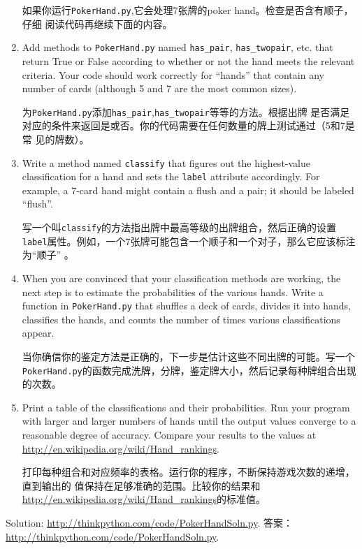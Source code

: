 \documentclass[10pt]{book}
\begin{document}
\begin{CJK}{UTF8}{gbsn}
\begin{exercise}
\begin{enumerate}
如果你运行{\tt PokerHand.py},它会处理7张牌的poker hand。检查是否含有顺子，仔细
阅读代码再继续下面的内容。

\item Add methods to {\tt PokerHand.py} named \verb"has_pair",
\verb"has_twopair", etc. that return True or False according to
whether or not the hand meets the relevant criteria.  Your code should
work correctly for ``hands'' that contain any number of cards
(although 5 and 7 are the most common sizes).

为{\tt PokerHand.py}添加\verb"has_pair",\verb"has_twopair"等等的方法。根据出牌
是否满足对应的条件来返回是或否。你的代码需要在任何数量的牌上测试通过（5和7是常
见的牌数）。

\item Write a method named {\tt classify} that figures out
the highest-value classification for a hand and sets the
{\tt label} attribute accordingly.  For example, a 7-card hand
might contain a flush and a pair; it should be labeled ``flush''.

写一个叫{\tt classify}的方法指出牌中最高等级的出牌组合，然后正确的设置{\tt
label}属性。例如，一个7张牌可能包含一个顺子和一个对子，那么它应该标注为``顺子''
。

\item When you are convinced that your classification methods are
working, the next step is to estimate the probabilities of the various
hands.  Write a function in {\tt PokerHand.py} that shuffles a deck of
cards, divides it into hands, classifies the hands, and counts the
number of times various classifications appear.

当你确信你的鉴定方法是正确的，下一步是估计这些不同出牌的可能。写一个{\tt
PokerHand.py}的函数完成洗牌，分牌，鉴定牌大小，然后记录每种牌组合出现的次数。

\item Print a table of the classifications and their probabilities.
Run your program with larger and larger numbers of hands until the
output values converge to a reasonable degree of accuracy.  Compare
your results to the values at \url{http://en.wikipedia.org/wiki/Hand_rankings}.

打印每种组合和对应频率的表格。运行你的程序，不断保持游戏次数的递增，直到输出的
值保持在足够准确的范围。比较你的结果和
\url{http://en.wikipedia.org/wiki/Hand_rankings}的标准值。

\end{enumerate}

Solution: \url{http://thinkpython.com/code/PokerHandSoln.py}.
答案：\url{http://thinkpython.com/code/PokerHandSoln.py}.
\end{exercise}



\end{CJK}
\end{document}
